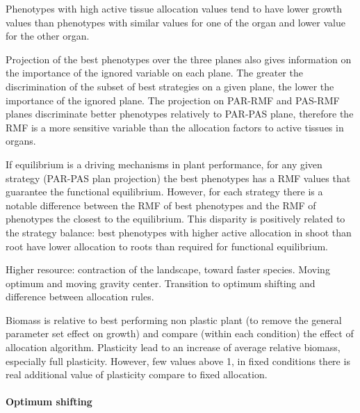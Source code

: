 Phenotypes with high active tissue allocation values tend to have lower growth values than phenotypes with similar values for one of the organ and lower value for the other organ. 

Projection of the best phenotypes over the three planes also gives information on the importance of the ignored variable on each plane. The greater the discrimination of the subset of best strategies on a given plane, the lower the importance of the ignored plane. The projection on PAR-RMF and PAS-RMF planes discriminate better phenotypes relatively to PAR-PAS plane, therefore the RMF is a more sensitive variable than the allocation factors to active tissues in organs.

If equilibrium is a driving mechanisms in plant performance, for any given strategy (PAR-PAS plan projection) the best phenotypes has a RMF values that guarantee the functional equilibrium. However, for each strategy there is a notable difference between the RMF of best phenotypes  and the RMF of phenotypes the closest to the equilibrium. This disparity is positively related to the strategy balance: best phenotypes with higher active allocation in shoot than root have lower allocation to roots than required for functional equilibrium. 

Higher resource: contraction of the landscape, toward faster species. Moving optimum and moving gravity center. Transition to optimum shifting and difference between allocation rules.


Biomass is relative to best performing non plastic plant (to remove the general parameter set effect on growth) and compare (within each condition) the effect of allocation algorithm. Plasticity lead to an increase of average relative biomass, especially full plasticity. However, few values above 1, in fixed conditions there is real additional value of plasticity compare to fixed allocation.\\

\paragraph{Optimum shifting}


